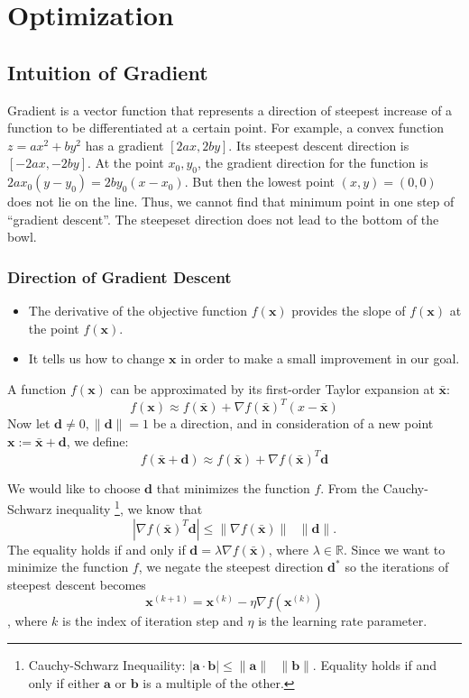 \chapter{Optimization}
\label{ch:optimization}

\section{Intuition of Gradient}

Gradient is a vector function that represents a direction of steepest increase of a function to be differentiated at a certain point. For example, a convex function $z = ax^2+by^2$ has a gradient $[2ax, 2by]$. Its steepest descent direction is $[-2ax, -2by]$. At the point $x_0,y_0$, the gradient direction for the function is $2ax_0(y-y_0) = 2by_0(x-x_0)$. But then the lowest point $(x,y) = (0,0)$ does not lie on the line. Thus, we cannot find that minimum point in one step of ``gradient descent''. The steepeset direction does not lead to the bottom of the bowl. 

\subsection{Direction of Gradient Descent}


\begin{itemize}
	\item The derivative of the objective function $f(\mathbf{x})$ provides the slope of $f(\mathbf{x})$ at the point $f(\mathbf{x})$.
	\item It tells us how to change $\mathbf{x}$ in order to make a small improvement in our goal.
\end{itemize}

	A function $f(\mathbf{x})$ can be approximated by its first-order Taylor expansion at $\bar{\mathbf{x}}$:
	$$f(\mathbf{x})\approx f(\bar{\mathbf{x}})+\nabla f(\bar{\mathbf{x}})^T(x-\bar{\mathbf{x}})$$
	Now let $\mathbf{d}\neq0, \|\mathbf{d}\|=1$ be a direction, and in consideration of a new point $\mathbf{x}:=\bar{\mathbf{x}}+\mathbf{d}$, we define:
	$$f(\bar{\mathbf{x}}+\mathbf{d})\approx f(\bar{\mathbf{x}})+\nabla f(\bar{\mathbf{x}})^T\mathbf{d}$$

We would like to choose $\mathbf{d}$ that minimizes the function $f$. From the Cauchy-Schwarz inequality \footnote{Cauchy-Schwarz Inequaility: $|\mathbf{a}\cdot \mathbf{b}|\leq \|\mathbf{a}\|\textrm{ } \|\mathbf{b}\|$. Equality holds if and only if either $\mathbf{a}$ or $\mathbf{b}$ is a multiple of the other.}, we know that
$$|\nabla f(\bar{\mathbf{x}})^T\mathbf{d}|\leq \|\nabla f(\bar{\mathbf{x}})\|\textrm{ }\|\mathbf{d}\|.$$
The equality holds if and only if $\mathbf{d}=\lambda \nabla f(\bar{\mathbf{x}})$, where $\lambda\in \mathbb{R}$. Since we want to minimize the function $f$, we negate the steepest direction $\mathbf{d}^{*}$ so the iterations of steepest descent becomes
	$$\mathbf{x}^{(k+1)} = \mathbf{x}^{(k)} - \eta \nabla f(\mathbf{x}^{(k)})$$
	, where $k$ is the index of iteration step and $\eta$ is the learning rate parameter.




